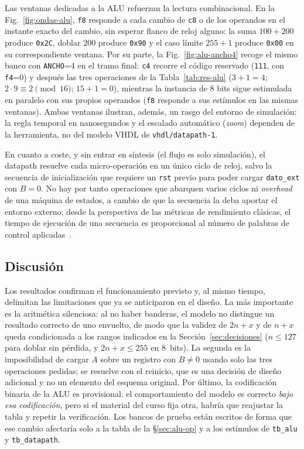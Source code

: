 \documentclass[llncs]{llncs}
\begin{document}
Las ventanas dedicadas a la ALU refuerzan la lectura combinacional.
En la Fig.~\ref{fig:ondas-alu}, \texttt{f8} responde a cada cambio de
\texttt{c8} o de los operandos en el instante exacto del cambio, sin
esperar flanco de reloj alguno: la suma $100+200$ produce \texttt{0x2C},
doblar $200$ produce \texttt{0x90} y el caso límite
$255+1$ produce \texttt{0x00} en su correspondiente ventana. Por su
parte, la Fig.~\ref{fig:alu-ancho4} recoge el mismo banco con
\texttt{ANCHO}=4 en el tramo final: \texttt{c4} recorre el código
reservado (\texttt{111}, con \texttt{f4}=0) y después las tres
operaciones de la Tabla~\ref{tab:res-alu} ($3+1=4$; $2\cdot9 \equiv 2 \pmod{16}$; $15+1=0$), mientras la instancia de 8 bits sigue
estimulada en paralelo con sus propios operandos (\texttt{f8} responde a
sus estímulos en las mismas ventanas). Ambas ventanas ilustran, además,
un rasgo del entorno de simulación: la regla temporal en nanosegundos y
el escalado automático (\emph{zoom}) dependen de la herramienta, no del
modelo VHDL de \texttt{vhdl/datapath-1}.

En cuanto a coste, y sin entrar en síntesis (el flujo es solo simulación),
el datapath resuelve cada micro-operación en un único ciclo de reloj,
salvo la secuencia de inicialización que requiere un \texttt{rst} previo
para poder cargar \texttt{dato\_ext} con $B=0$. No hay por tanto
operaciones que abarquen varios ciclos ni \emph{overhead} de una máquina de
estados,
a cambio de que la secuencia la deba aportar el entorno externo; desde la
perspectiva de las métricas de rendimiento clásicas, el tiempo de
ejecución de una secuencia es proporcional al número de palabras de
control aplicadas~\cite{stallings2015coa,hennessy2017qa}.

\subsection{Discusión}

Los resultados confirman el funcionamiento previsto y, al mismo tiempo,
delimitan las limitaciones que ya se anticiparon en el diseño. La más
importante es la aritmética silenciosa: al no haber banderas, el modelo no
distingue un resultado correcto de uno envuelto, de modo que la validez de
$2n+x$ y de $n+x$ queda condicionada a los rangos indicados en la
Sección~\ref{sec:decisiones} ($n \le 127$ para doblar sin pérdida, y
$2n+x \le 255$ en 8~bits). La segunda es la imposibilidad de cargar
$A$ sobre un registro con $B \neq 0$ usando solo las tres operaciones
pedidas; se resuelve con el reinicio, que es una decisión de diseño
adicional y no un elemento del esquema original. Por último, la
codificación binaria de la ALU es provisional: el comportamiento del
modelo es correcto \emph{bajo esa codificación}, pero si el material del
curso fija otra, habría que reajustar la tabla y repetir la verificación.
Los bancos de prueba están escritos de forma que ese cambio afectaría solo
a la tabla de la §\ref{sec:alu-op} y a los estímulos de \texttt{tb\_alu} y
\texttt{tb\_datapath}.
\end{document}

